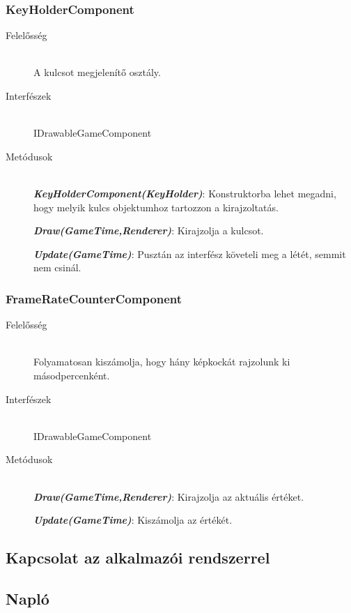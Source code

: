 \subsubsection{KeyHolderComponent}
	\begin{description}
		\item[Felelősség] \hfill \\
		A kulcsot megjelenítő osztály.
		\item[Interfészek] \hfill \\
		IDrawableGameComponent

		\item[Metódusok] \hfill \\
		\textbf{\emph{KeyHolderComponent(KeyHolder)}}: Konstruktorba lehet megadni, hogy melyik kulcs objektumhoz tartozzon a kirajzoltatás.

		\textbf{\emph{Draw(GameTime,Renderer)}}: Kirajzolja a kulcsot.

		\textbf{\emph{Update(GameTime)}}: Pusztán az interfész követeli meg a létét, semmit nem csinál.
	\end{description}
	
\subsubsection{FrameRateCounterComponent}
	\begin{description}
		\item[Felelősség] \hfill \\
		Folyamatosan kiszámolja, hogy hány képkockát rajzolunk ki másodpercenként.
		\item[Interfészek] \hfill \\
		IDrawableGameComponent

		\item[Metódusok] \hfill \\
		\textbf{\emph{Draw(GameTime,Renderer)}}: Kirajzolja az aktuális értéket.

		\textbf{\emph{Update(GameTime)}}: Kiszámolja az értékét.
	\end{description}
	
\subsection{Kapcsolat az alkalmazói rendszerrel}

\subsection{Napló}

\begin{journal}

\end{journal}

